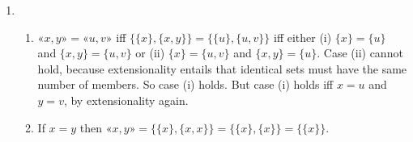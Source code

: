 \begin{enumerate}
\begin{enumerate}
	\end{enumerate} \setcounter{enumi}{3}
	\item \begin{enumerate}
		\item $«x,y»= «u,v»$ iff $\{\{x\},\{x,y\}\} = \{\{u\},\{u,v\}\}$ iff either (i) $\{x\}=\{u\}$ and $\{x,y\}=\{u,v\}$ or (ii) $\{x\} = \{u,v\}$ and $\{x,y\} = \{u\}$. Case (ii) cannot hold, because extensionality entails that identical sets must have the same number of members. So case (i) holds. But case (i) holds iff $x=u$ and $y=v$, by extensionality again.
		\item If $x=y$ then $«x,y»=\{\{x\},\{x,x\}\}=\{\{x\},\{x\}\}=\{\{x\}\}$.
	\end{enumerate}
\end{enumerate}